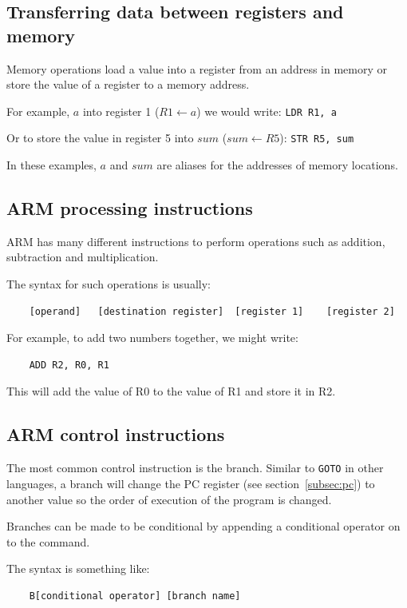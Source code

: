 \subsection{Transferring data between registers and memory}

Memory operations load a value into a register from an address in memory or
store the value of a register to a memory address.

For example, $a$ into register 1 ($R1 \leftarrow a$) we would write:
{\tt LDR R1, a}

Or to store the value in register 5 into $sum$ ($sum \leftarrow R5$):
{\tt STR R5, sum}

In these examples, $a$ and $sum$ are aliases for the addresses of memory
locations.

\subsection{ARM processing instructions}

ARM has many different instructions to perform operations such as addition,
subtraction and multiplication.

The syntax for such operations is usually:

\begin{verbatim}
	[operand]	[destination register]	[register 1]	[register 2]
\end{verbatim}

For example, to add two numbers together, we might write:

\begin{verbatim}
	ADD	R2, R0, R1
\end{verbatim}

This will add the value of R0 to the value of R1 and store it in R2.

\subsection{ARM control instructions}

The most common control instruction is the branch. Similar to \texttt{GOTO} in
other languages, a branch will change the PC register (see
section~\ref{subsec:pc}) to another value so the order of execution of the
program is changed.

Branches can be made to be conditional by appending a conditional operator on to
the command.

The syntax is something like:

\begin{verbatim}
	B[conditional operator]	[branch name]
\end{verbatim}

